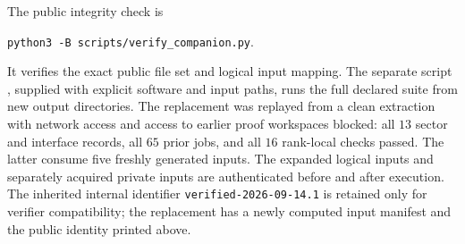 \documentclass[11pt]{article}
\theoremstyle{definition}
\theoremstyle{remark}
\begin{document}
The public integrity check is
\begin{center}
\texttt{python3 -B scripts/verify\_companion.py}.
\end{center}
It verifies the exact public file set and logical input mapping.
The separate script , supplied with
explicit software and input paths, runs the full declared suite from
new output directories. The replacement was replayed from a clean
extraction with network access and access to earlier proof workspaces
blocked: all $13$ sector and interface records, all $65$ prior jobs,
and all $16$ rank-local checks passed. The latter consume five freshly
generated inputs. The expanded logical inputs and separately acquired
private inputs are authenticated before and after execution.
The inherited internal identifier \texttt{verified-2026-09-14.1} is
retained only for verifier compatibility; the replacement has a newly
computed input manifest and the public identity printed above.
\end{document}
